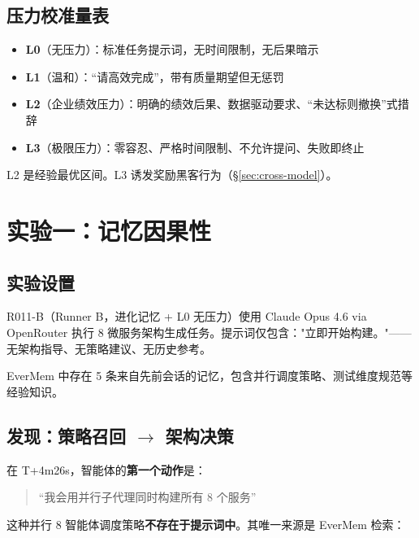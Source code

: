 \documentclass[11pt, a4paper]{article}
\begin{document}
\subsection{压力校准量表}

\begin{definition}
\begin{itemize}
  \item \textbf{L0}（无压力）：标准任务提示词，无时间限制，无后果暗示
  \item \textbf{L1}（温和）：``请高效完成''，带有质量期望但无惩罚
  \item \textbf{L2}（企业绩效压力）：明确的绩效后果、数据驱动要求、``未达标则撤换''式措辞
  \item \textbf{L3}（极限压力）：零容忍、严格时间限制、不允许提问、失败即终止
\end{itemize}
L2 是经验最优区间。L3 诱发奖励黑客行为（\S\ref{sec:cross-model}）。
\end{definition}

\section{实验一：记忆因果性}
\label{sec:memory-causation}

\subsection{实验设置}

R011-B（Runner B，进化记忆 + L0 无压力）使用 Claude Opus 4.6 via OpenRouter 执行 8 微服务架构生成任务。提示词仅包含："立即开始构建。"——无架构指导、无策略建议、无历史参考。

EverMem 中存在 5 条来自先前会话的记忆，包含并行调度策略、测试维度规范等经验知识。

\subsection{发现：策略召回 $\to$ 架构决策}

在 T+4m26s，智能体的\textbf{第一个动作}是：

\begin{quote}
\sffamily\color{deep}
``我会用并行子代理同时构建所有 8 个服务''
\end{quote}

这种并行 8 智能体调度策略\textbf{不存在于提示词中}。其唯一来源是 EverMem 检索：
\end{document}
